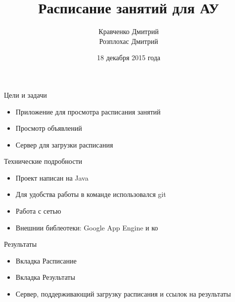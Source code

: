 \documentclass[12pt]{beamer}
\begin{document}
\title{Расписание занятий для АУ}

\author[]{
    Кравченко Дмитрий \\
    Розплохас Дмитрий \\ 
}
\date{18 декабря 2015 года}

\frame{\titlepage}

\begin{frame}{Цели и задачи}

    \begin{itemize}

        \item <1-> Приложение для просмотра расписания занятий

        \item <2-> Просмотр объявлений
        
        \item <3-> Сервер для загрузки расписания

        \end{itemize}

\end{frame}

\begin{frame}{Технические подробности}

    \begin{itemize}
    
        \item <1-> Проект написан на Java

        \item <2-> Для удобства работы в команде использовался git

        \item <3-> Работа с сетью

        \item <4-> Внешнии библеотеки: Google App Engine и ко

    \end{itemize}

\end{frame}

\begin{frame}{Результаты}
    
    \begin{itemize}
    
        \item <1-> Вкладка Расписание

        \item <2-> Вкладка Результаты

        \item <3-> Сервер, поддерживающий загрузку расписания и ссылок на результаты

    \end{itemize}

\end{frame}
\end{document}
